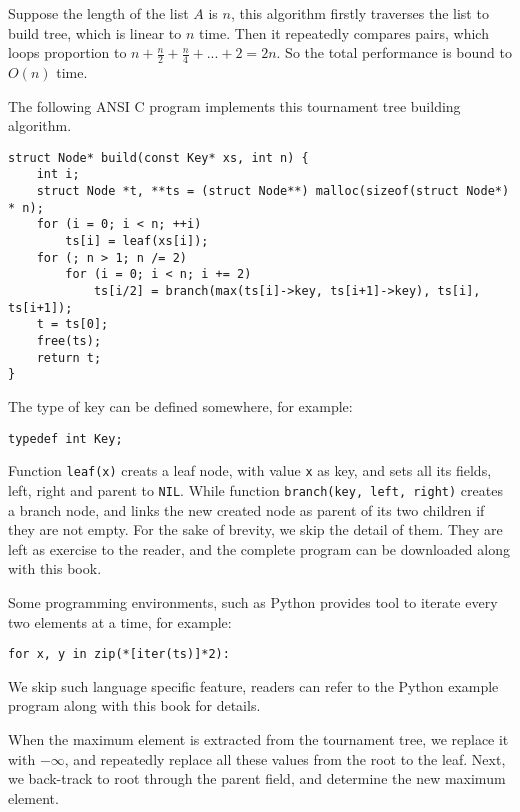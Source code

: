 \documentclass{article}
\begin{document}
Suppose the length of the list $A$ is $n$, this algorithm firstly traverses the list to build tree,
which is linear to $n$ time. Then it repeatedly compares pairs, which loops proportion to
$n + \frac{n}{2} + \frac{n}{4} + ... + 2 = 2n$. So the total performance is bound to $O(n)$ time.

The following ANSI C program implements this tournament tree building algorithm.

\lstset{language=C}
\begin{lstlisting}
struct Node* build(const Key* xs, int n) {
    int i;
    struct Node *t, **ts = (struct Node**) malloc(sizeof(struct Node*) * n);
    for (i = 0; i < n; ++i)
        ts[i] = leaf(xs[i]);
    for (; n > 1; n /= 2)
        for (i = 0; i < n; i += 2)
            ts[i/2] = branch(max(ts[i]->key, ts[i+1]->key), ts[i], ts[i+1]);
    t = ts[0];
    free(ts);
    return t;
}
\end{lstlisting}

The type of key can be defined somewhere, for example:

\lstset{language=C}
\begin{lstlisting}
typedef int Key;
\end{lstlisting}

Function \texttt{leaf(x)} creats a leaf node, with value \texttt{x} as key,
and sets all its fields, left, right and parent to \texttt{NIL}.
While function \texttt{branch(key, left, right)} creates a branch node, and links the new
created node as parent of its two children if they are not empty. For the sake of
brevity, we skip the detail of them. They are left as exercise to the reader, and
the complete program can be downloaded along with this book.

Some programming environments, such as Python provides tool to iterate every two elements
at a time, for example:

\lstset{language=Python}
\begin{lstlisting}
for x, y in zip(*[iter(ts)]*2):
\end{lstlisting}

We skip such language specific feature, readers can refer to the Python example program
along with this book for details.

When the maximum element is extracted from the tournament tree, we replace it with $-\infty$,
and repeatedly replace all these values from the root to the leaf. Next, we back-track
to root through the parent field, and determine the new maximum element.
\end{document}

